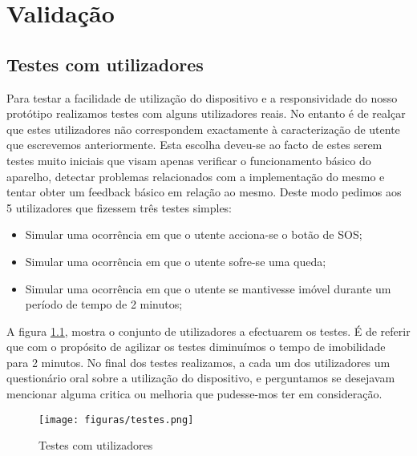 \chapter{Validação}
\label{cap5}

\section{Testes com utilizadores}

Para testar a facilidade de utilização do dispositivo e a responsividade do nosso protótipo realizamos testes com alguns utilizadores reais. No entanto é de realçar que estes utilizadores não correspondem exactamente à caracterização de utente que escrevemos anteriormente. Esta escolha deveu-se ao facto de estes serem testes muito iniciais que visam apenas verificar o funcionamento básico do aparelho, detectar problemas relacionados com a implementação do mesmo e tentar obter um feedback básico em relação ao mesmo.
Deste modo pedimos aos 5 utilizadores que fizessem três testes simples:
\begin{itemize}
	\item Simular uma ocorrência em que o utente acciona-se o botão de SOS;
	\item Simular uma ocorrência em que o utente sofre-se uma queda;
	\item Simular uma ocorrência em que o utente se mantivesse imóvel durante um período de tempo de 2 minutos;
\end{itemize}

A figura \ref{fig:testes}, mostra o conjunto de utilizadores a efectuarem os testes. É de referir que com o propósito de agilizar os testes diminuímos o tempo de imobilidade para 2 minutos.
No final dos testes realizamos, a cada um dos utilizadores um questionário oral sobre a utilização do dispositivo, e perguntamos se desejavam mencionar alguma critica ou melhoria que pudesse-mos ter em consideração.

\begin{figure}[!htb]
	\centering
	\texttt{[image: figuras/testes.png]}
	\caption{Testes com utilizadores}
	\label{fig:testes}
\end{figure}



